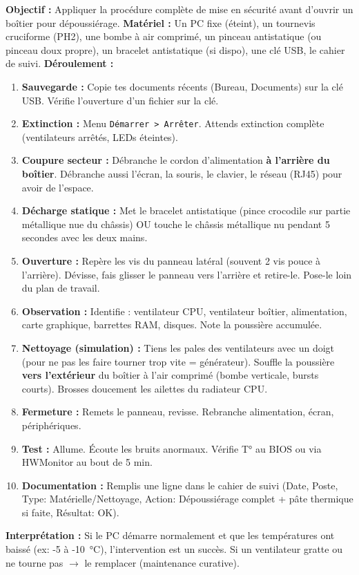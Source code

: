 \documentclass[11pt]{article}
\begin{document}
\begin{experience}
\textbf{Objectif :} Appliquer la procédure complète de mise en sécurité avant d'ouvrir un boîtier pour dépoussiérage.
\textbf{Matériel :} Un PC fixe (éteint), un tournevis cruciforme (PH2), une bombe à air comprimé, un pinceau antistatique (ou pinceau doux propre), un bracelet antistatique (si dispo), une clé USB, le cahier de suivi.
\textbf{Déroulement :}
\begin{enumerate}
    \item \textbf{Sauvegarde :} Copie tes documents récents (Bureau, Documents) sur la clé USB. Vérifie l'ouverture d'un fichier sur la clé.
    \item \textbf{Extinction :} Menu \texttt{Démarrer > Arrêter}. Attends extinction complète (ventilateurs arrêtés, LEDs éteintes).
    \item \textbf{Coupure secteur :} Débranche le cordon d'alimentation \textbf{à l'arrière du boîtier}. Débranche aussi l'écran, la souris, le clavier, le réseau (RJ45) pour avoir de l'espace.
    \item \textbf{Décharge statique :} Met le bracelet antistatique (pince crocodile sur partie métallique nue du châssis) OU touche le châssis métallique nu pendant 5 secondes avec les deux mains.
    \item \textbf{Ouverture :} Repère les vis du panneau latéral (souvent 2 vis pouce à l'arrière). Dévisse, fais glisser le panneau vers l'arrière et retire-le. Pose-le loin du plan de travail.
    \item \textbf{Observation :} Identifie : ventilateur CPU, ventilateur boîtier, alimentation, carte graphique, barrettes RAM, disques. Note la poussière accumulée.
    \item \textbf{Nettoyage (simulation) :} Tiens les pales des ventilateurs avec un doigt (pour ne pas les faire tourner trop vite = générateur). Souffle la poussière \textbf{vers l'extérieur} du boîtier à l'air comprimé (bombe verticale, bursts courts). Brosses doucement les ailettes du radiateur CPU.
    \item \textbf{Fermeture :} Remets le panneau, revisse. Rebranche alimentation, écran, périphériques.
    \item \textbf{Test :} Allume. Écoute les bruits anormaux. Vérifie T° au BIOS ou via HWMonitor au bout de 5 min.
    \item \textbf{Documentation :} Remplis une ligne dans le cahier de suivi (Date, Poste, Type: Matérielle/Nettoyage, Action: Dépoussiérage complet + pâte thermique si faite, Résultat: OK).
\end{enumerate}
\textbf{Interprétation :} Si le PC démarre normalement et que les températures ont baissé (ex: -5 à -\SI{10}{\celsius}), l'intervention est un succès. Si un ventilateur gratte ou ne tourne pas $\rightarrow$ le remplacer (maintenance curative).
\end{experience}
\end{document}
